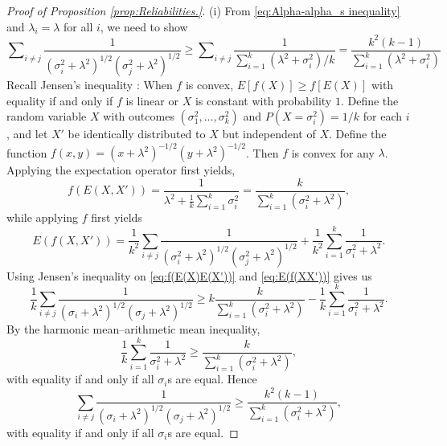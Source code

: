 \documentclass[twoside]{article}
\DeclareMathOperator{\tsum}{\textstyle \sum}
\renewcommand{\sqrt}[1]{{(#1)^{1/2}}}
\begin{document}
\begin{proof}[Proof of Proposition \ref{prop:Reliabilities.}]\label{proof:Reliabilities.}
(i) From \cref{eq:Alpha-alpha_s inequality} and $\lambda_{i}=\lambda$
for all $i$, we need to show
\[
\tsum_{i\neq j}\frac{1}{\sqrt{\sigma_{i}^{2}+\lambda^{2}}\sqrt{\sigma_{j}^{2}+\lambda^{2}}}\geq\tsum_{i\neq j}\frac{1}{\tsum_{i=1}^{k}(\lambda^{2}+\sigma_{i}^{2})/k} =
\frac{k^2(k-1)}{\tsum_{i=1}^{k}(\lambda^{2}+\sigma_{i}^{2})}
\]
Recall Jensen's inequality \citep[Theorem 12 of Chapter 1]{Bullen2013-os}: When $f$ is convex, $E[f(X)]\geq f[E(X)]$ with equality if and only if $f$ is linear or $X$ is constant with probability $1$. 
Define the random variable $X$ with outcomes $(\sigma_{1}^{2},\ldots,\sigma_{k}^{2})$
and $P(X=\sigma_{i}^{2})=1/k$ for each $i$, and let $X'$ be identically
distributed to $X$ but independent of $X$. Define the function $f(x,y)=(x+\lambda^{2})^{-1/2}(y+\lambda^{2})^{-1/2}$.
Then $f$ is convex for any $\lambda$. Applying the expectation operator
first yields,
\begin{equation}
f(E(X,X'))=\frac{1}{\lambda^{2}+\frac{1}{k}\sum_{i=1}^{k}\sigma_{i}^{2}}=\frac{k}{\sum_{i=1}^{k}(\sigma_{i}^{2}+\lambda^{2})},\label{eq:f(E(X)E(X'))}
\end{equation}
while applying $f$ first yields
\begin{equation}
E(f(X,X')) = \frac{1}{k^{2}}\sum_{i\neq j}\frac{1}{(\sigma_{i}^{2}+\lambda^{2})^{1/2}(\sigma_{j}^{2}+\lambda^{2})^{1/2}}+\frac{1}{k^{2}}\sum_{i=1}^{k}\frac{1}{\sigma_{i}^{2}+\lambda^{2}}.\label{eq:E(f(XX'))}
\end{equation}
Using Jensen's inequality on \cref{eq:f(E(X)E(X'))} and \cref{eq:E(f(XX'))}
gives us
\begin{equation*}
\frac{1}{k}\sum_{i\neq j}\frac{1}{(\sigma_{i}+\lambda^{2})^{1/2}(\sigma_{j}+\lambda^{2})^{1/2}} \geq k\frac{k}{\sum_{i=1}^{k}(\sigma_{i}^{2}+\lambda^{2})}-\frac{1}{k}\sum_{i=1}^{k}\frac{1}{\sigma_{i}^{2}+\lambda^{2}}.
\end{equation*}
By the harmonic mean--arithmetic mean inequality, 
\[
\frac{1}{k}\sum_{i=1}^{k}\frac{1}{\sigma_{i}^{2}+\lambda^{2}}\geq\frac{k}{\sum_{i=1}^{k}(\sigma_{i}^{2}+\lambda^{2})},
\]
with equality if and only if all $\sigma_{i}$s are equal. Hence
\[
\sum_{i\neq j}\frac{1}{(\sigma_{i}+\lambda^{2})^{1/2}(\sigma_{j}+\lambda^{2})^{1/2}}\geq\frac{k^{2}(k-1)}{\sum_{i=1}^{k}(\sigma_{i}^{2}+\lambda^{2})},
\]
with equality if and only if all $\sigma_{i}$s are equal.


\end{proof}
\end{document}
